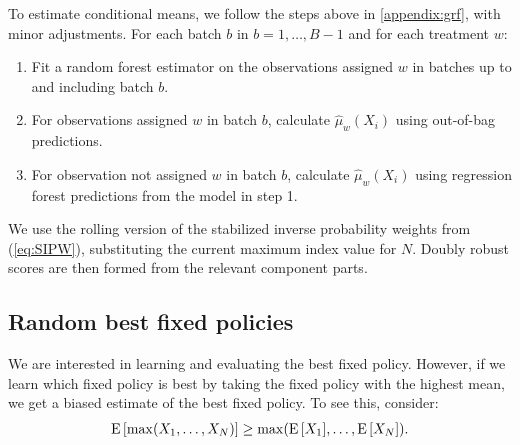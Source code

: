 \documentclass[letterpaper, 12pt, parskip=full,]{scrartcl}
\begin{document}
To estimate conditional means, we follow the steps above in \ref{appendix:grf}, with minor adjustments. For each batch $b$ in $b = 1, \dots, B-1$ and for each treatment $w$:
\begin{enumerate}
\item Fit a random forest estimator on the observations assigned $w$ in batches up to and including batch $b$. 
\item For observations assigned $w$ in batch $b$, calculate $\hat\mu_w(X_i)$ using out-of-bag predictions. 
\item For observation not assigned $w$ in batch $b$, calculate $\hat\mu_w(X_i)$ using regression forest predictions from the model in step 1. 
\end{enumerate}

We use the rolling version of the stabilized inverse probability weights from (\ref{eq:SIPW}), substituting the current maximum index value for $N$. 
Doubly robust scores are then formed from the relevant component parts. 


\subsection{Random best fixed policies}\label{appendix:bestfixed}
We are interested in learning and evaluating the best fixed policy. However, if we learn which fixed policy is best by taking the fixed policy with the highest mean, we get a biased estimate of the best fixed policy. To see this, consider:
\begin{align*}
{\textrm E}\,[\max(X_1, \dots, X_N)] \ge \max({\textrm E}\,[X_1],\dots, {\textrm E}\,[X_N]). 
\end{align*}
\end{document}
